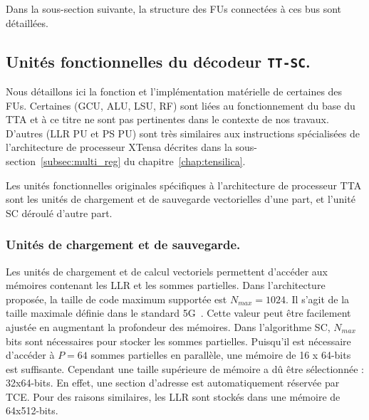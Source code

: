 Dans la sous-section suivante, la structure des FUs connectées à ces bus sont détaillées.

\subsection{Unités fonctionnelles du décodeur \texttt{TT-SC}.}
Nous détaillons ici la fonction et l'implémentation matérielle de certaines des FUs. Certaines (GCU, ALU, LSU, RF) sont liées au fonctionnement du base du TTA et à ce titre ne sont pas pertinentes dans le contexte de nos travaux. D'autres (LLR PU et PS PU) sont très similaires aux instructions spécialisées de l'architecture de processeur XTensa décrites dans la sous-section~\ref{subsec:multi_reg} du chapitre~\ref{chap:tensilica}.

Les unités fonctionnelles originales spécifiques à l'architecture de processeur TTA sont les unités de chargement et de sauvegarde vectorielles d'une part, et l'unité \og SC déroulé \fg d'autre part.

\subsubsection{Unités de chargement et de sauvegarde.}

Les unités de chargement et de calcul vectoriels permettent d'accéder aux mémoires contenant les LLR et les sommes partielles. Dans l'architecture proposée, la taille de code maximum supportée est $N_{max}=1024$. Il s'agit de la taille maximale définie dans le standard 5G~\cite{3gpp_ts_2017}. Cette valeur peut être facilement ajustée en augmentant la profondeur des mémoires. Dans l'algorithme SC, $N_{max}$ bits sont nécessaires pour stocker les sommes partielles. Puisqu'il est nécessaire d'accéder à $P=64$ sommes partielles en parallèle, une mémoire de 16 x 64-bits est suffisante. Cependant une taille supérieure de mémoire a dû être sélectionnée : 32x64-bits. En effet, une section d'adresse est automatiquement réservée par TCE. Pour des raisons similaires, les LLR sont stockés dans une mémoire de 64x512-bits.

